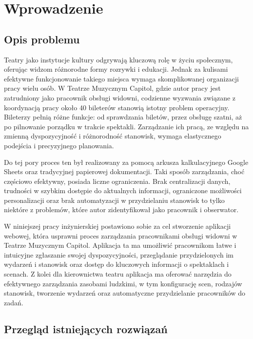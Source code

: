 \documentclass[shortabstract]{iithesis}
\author         {Adam Jarząbek}
\date          {21 czerwca 2024}                     %
\begin{document}

\chapter{Wprowadzenie}

\section{Opis problemu}

Teatry jako instytucje kultury odgrywają kluczową rolę w życiu społecznym, oferując widzom różnorodne formy rozrywki i edukacji. Jednak za kulisami efektywne funkcjonowanie takiego miejsca wymaga skomplikowanej organizacji pracy wielu osób. W Teatrze Muzycznym Capitol, gdzie autor pracy jest zatrudniony jako pracownik obsługi widowni, codzienne wyzwania związane z koordynacją pracy około 40 bileterów stanowią istotny problem operacyjny. Bileterzy pełnią różne funkcje:  od sprawdzania biletów, przez obsługę szatni, aż po pilnowanie porządku w trakcie spektakli. Zarządzanie ich pracą, ze względu na zmienną dyspozycyjność i różnorodność stanowisk, wymaga elastycznego podejścia i precyzyjnego planowania.

Do tej pory proces ten był realizowany za pomocą arkusza kalkulacyjnego Google Sheets oraz tradycyjnej papierowej dokumentacji. Taki sposób zarządzania, choć częściowo efektywny, posiada liczne ograniczenia. Brak centralizacji danych, trudności w szybkim dostępie do aktualnych informacji, ograniczone możliwości personalizacji oraz brak automatyzacji w przydzielaniu stanowisk to tylko niektóre z problemów, które autor zidentyfikował jako pracownik i obserwator.

W niniejszej pracy inżynierskiej postawiono sobie za cel stworzenie aplikacji webowej, która usprawni proces zarządzania pracownikami obsługi widowni w Teatrze Muzycznym Capitol. Aplikacja ta ma umożliwić pracownikom łatwe i intuicyjne zgłaszanie swojej dyspozycyjności, przeglądanie przydzielonych im wydarzeń i stanowisk oraz dostęp do kluczowych informacji o spektaklach i scenach. Z kolei dla kierownictwa teatru aplikacja ma oferować narzędzia do efektywnego zarządzania zasobami ludzkimi, w tym konfigurację scen, rodzajów stanowisk, tworzenie wydarzeń oraz automatyczne przydzielanie pracowników do zadań.


\section{Przegląd istniejących rozwiązań}
\end{document}
